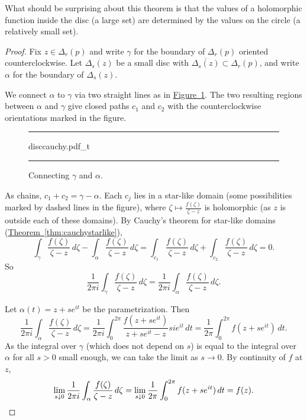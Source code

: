 \documentclass[12pt,openany]{book}
\theoremstyle{plain}
\theoremstyle{remark}
\theoremstyle{definition}
\newenvironment{myfig}{%
\begin{figure}[h!t]
\noindent\rule{\textwidth}{0.5pt}\vspace{12pt}\par\centering}%
{\par\noindent\rule{\textwidth}{0.5pt}
\end{figure}}
\theoremstyle{exercise}
\theoremstyle{example}
\newcommand{\figureref}[1]{\hyperref[#1]{Figure~\ref*{#1}}}
\newcommand{\thmref}[1]{\hyperref[#1]{Theorem~\ref*{#1}}}
\begin{document}
What should be surprising about this theorem is that the values of a
holomorphic function inside the disc (a large set) are determined by the
values on the circle (a relatively small set).

\begin{proof}
Fix $z \in \Delta_r(p)$ and write
$\gamma$ for the boundary of $\Delta_r(p)$ oriented counterclockwise.
Let $\Delta_s(z)$ be a small disc with $\overline{\Delta_s(z)} \subset
\Delta_r(p)$, and write $\alpha$ for the boundary of $\Delta_s(z)$.

We connect $\alpha$ to $\gamma$
via two straight lines as in \figureref{fig:disccauchy}.
The two resulting regions between $\alpha$ and $\gamma$
give closed paths $c_1$ and $c_2$ with the counterclockwise
orientations marked in the figure.
\begin{myfig}
{disccauchy.pdf_t}
\caption{Connecting $\gamma$ and $\alpha$.%
\label{fig:disccauchy}}
\end{myfig}

As chains, $c_1+c_2 = \gamma - \alpha$.  Each
$c_j$ lies in a star-like domain (some possibilities marked by dashed lines in the figure),
where $\zeta \mapsto \frac{f(\zeta)}{\zeta-z}$ is holomorphic
(as $z$ is outside each of these domains).
By Cauchy's theorem for star-like domains (\thmref{thm:cauchystarlike}),
\begin{equation*}
\int_{\gamma} \frac{f(\zeta)}{\zeta-z} \, d\zeta -
\int_{\alpha} \frac{f(\zeta)}{\zeta-z} \, d\zeta =
\int_{c_1} \frac{f(\zeta)}{\zeta-z} \, d\zeta + 
\int_{c_2} \frac{f(\zeta)}{\zeta-z} \, d\zeta = 0 .
\end{equation*}
So
\begin{equation*}
\frac{1}{2\pi i}
\int_{\gamma} \frac{f(\zeta)}{\zeta-z} \, d\zeta =
\frac{1}{2\pi i}
\int_{\alpha} \frac{f(\zeta)}{\zeta-z} \, d\zeta .
\end{equation*}

Let $\alpha(t) = z+s e^{i t}$ be the parametrization.
Then
\begin{equation*}
\frac{1}{2\pi i}
\int_{\alpha}
\frac{f(\zeta)}{\zeta-z}
\,
d \zeta
=
\frac{1}{2\pi i}
\int_0^{2\pi} \frac{f(z+se^{it})}{z + se^{it} - z} s i e^{it} \, dt
=
\frac{1}{2\pi}
\int_0^{2\pi} f(z+se^{it}) \, dt .
\end{equation*}
As the integral over $\gamma$ (which does not depend on $s$)
is equal to the integral over $\alpha$ for all $s > 0$ small enough,
we can take the limit as $s \to 0$.
By continuity of $f$ at $z$,
\begin{equation*}
\lim_{s \downarrow 0}
\frac{1}{2\pi i}
\int_{\alpha}
\frac{f(\zeta)}{\zeta-z}
\,
d \zeta
=
\lim_{s \downarrow 0}
\frac{1}{2\pi}
\int_0^{2\pi} f(z+se^{it}) \, dt
=
f(z) . \qedhere
\end{equation*}
\end{proof}
\end{document}
